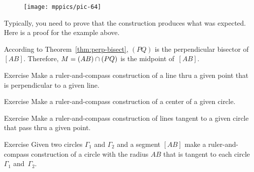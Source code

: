\begin{figure}[!ht]
\centering
\texttt{[image: mppics/pic-64]}
\end{figure}

Typically, you need to prove that the construction produces what was expected. Here is a proof for the example above.

According to Theorem~\ref{thm:perp-bisect}, $(PQ)$ is the perpendicular bisector of~$[AB]$.
Therefore, $M=(AB)\cap(PQ)$ is the midpoint of~$[AB]$. 
\qeds



\begin{thm}{Exercise}\label{ex:construction-perpendicular}
Make a ruler-and-compass construction of a line thru a given point that is perpendicular to a given line.
\end{thm}

\begin{thm}{Exercise}\label{ex:center}
Make a ruler-and-compass construction of a center 
of a given circle.
\end{thm}

\begin{thm}{Exercise}\label{ex:tangent}
Make a ruler-and-compass construction of lines tangent to a given circle that pass thru a given point.
\end{thm}

\begin{thm}{Exercise}\label{ex:tangent-circle}
Given two circles $\Gamma_1$ and $\Gamma_2$ and a segment $[AB]$
make a ruler-and-compass construction of a circle with the radius $AB$ 
that is tangent to each circle $\Gamma_1$ and~$\Gamma_2$.
\end{thm}

